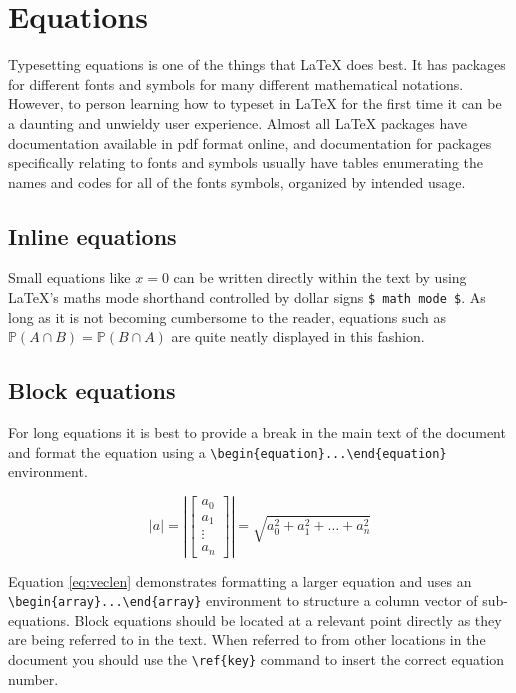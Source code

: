\section{Equations}
	\label{sec:typesetting_equations}
	
	Typesetting equations is one of the things that LaTeX does best. It has packages for different fonts and symbols for many different mathematical notations. However, to person learning how to typeset in LaTeX for the first time it can be a daunting and unwieldy user experience. Almost all LaTeX packages have documentation available in pdf format online, and documentation for packages specifically relating to fonts and symbols usually have tables enumerating the names and codes for all of the fonts symbols, organized by intended usage. 
	
	\subsection{Inline equations}
	
	Small equations like $x = 0$ can be written directly within the text by using LaTeX's maths mode shorthand controlled by dollar signs \lstinline|$ math mode $|. As long as it is not becoming cumbersome to the reader, equations such as $\mathbb{P}({A} \cap {B}) = \mathbb{P}({B} \cap {A})$ are quite neatly displayed in this fashion. 
	
	\newpage 
	
	\subsection{Block equations}
	
		For long equations it is best to provide a break in the main text of the document and format the equation using a \lstinline|\begin{equation}...\end{equation}| environment. 
		
		\begin{equation} \label{eq:veclen}
			\left\lvert a \right\rvert = \left\lvert \left[\begin{array}{c} a_0\\ a_1\\ \vdots\\ a_n\end{array}\right] \right\rvert = \sqrt{a_0^2 + a_1^2 + \hdots + a_n^2}
		\end{equation}
		
		Equation \ref{eq:veclen} demonstrates formatting a larger equation and uses an \lstinline|\begin{array}...\end{array}| environment to structure a column vector of sub-equations. Block equations should be located at a relevant point directly as they are being referred to in the text. When referred to from other locations in the document you should use the \lstinline|\ref{key}| command to insert the correct equation number.
		
